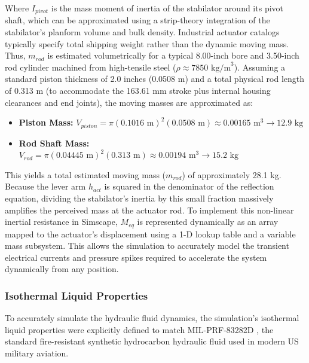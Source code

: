 \documentclass[
bindingoffset=5mm,  %
footnoteindent=3mm, %
hyphenation=true    %
]{src/wut-thesis}
\begin{document}
	Where $I_{pivot}$ is the mass moment of inertia of the stabilator around its pivot shaft, which can be approximated using a strip-theory integration of the stabilator's planform volume and bulk density. Industrial actuator catalogs typically specify total shipping weight rather than the dynamic moving mass. Thus, $m_{rod}$ is estimated volumetrically for a typical 8.00-inch bore and 3.50-inch rod cylinder machined from high-tensile steel ($\rho \approx 7850 \text{ kg/m}^3$). Assuming a standard piston thickness of 2.0 inches (0.0508 m) and a total physical rod length of 0.313 m (to accommodate the 163.61 mm stroke plus internal housing clearances and end joints), the moving masses are approximated as:
	
	\begin{itemize}
		\item \textbf{Piston Mass:} $V_{piston} = \pi (0.1016 \text{ m})^2 (0.0508 \text{ m}) \approx 0.00165 \text{ m}^3 \rightarrow 12.9 \text{ kg}$
		\item \textbf{Rod Shaft Mass:} $V_{rod} = \pi (0.04445 \text{ m})^2 (0.313 \text{ m}) \approx 0.00194 \text{ m}^3 \rightarrow 15.2 \text{ kg}$
	\end{itemize}
	
	This yields a total estimated moving mass ($m_{rod}$) of approximately 28.1 kg. Because the lever arm $h_{act}$ is squared in the denominator of the reflection equation, dividing the stabilator's inertia by this small fraction massively amplifies the perceived mass at the actuator rod. To implement this non-linear inertial resistance in Simscape, $M_{eq}$ is represented dynamically as an array mapped to the actuator's displacement using a 1-D lookup table and a variable mass subsystem. This allows the simulation to accurately model the transient electrical currents and pressure spikes required to accelerate the system dynamically from any position.
	
	\subsubsection{Isothermal Liquid Properties}
	
	To accurately simulate the hydraulic fluid dynamics, the simulation's isothermal liquid properties were explicitly defined to match MIL-PRF-83282D \cite{mil_prf_83282d}, the standard fire-resistant synthetic hydrocarbon hydraulic fluid used in modern US military aviation.
	
\end{document}
